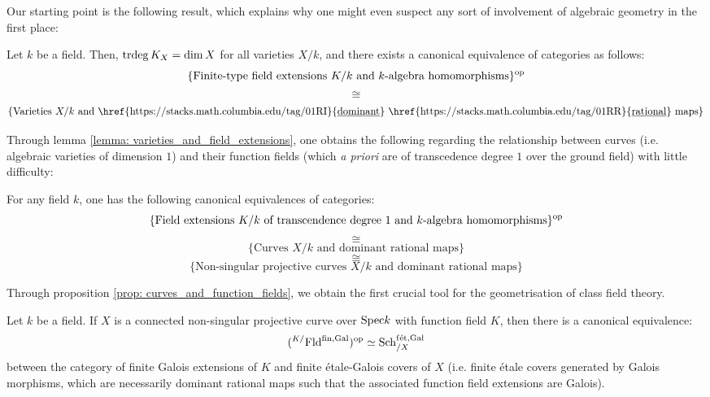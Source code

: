             Our starting point is the following result, which explains why one might even suspect any sort of involvement of algebraic geometry in the first place:
            \begin{lemma} \label{lemma: varieties_and_field_extensions}
                \cite[\href{https://stacks.math.columbia.edu/tag/0BXN}{Tag 0BXN}]{stacks} Let $k$ be a field. Then, $\operatorname{trdeg} K_X = \dim X$ for all varieties $X/k$, and there exists a canonical equivalence of categories as follows:
                    $$\{\text{Finite-type field extensions $K/k$ and $k$-algebra homomorphisms}\}^{\mathrm{op}}$$
                    $$\cong$$
                    $$\{\text{Varieties $X/k$ and \href{https://stacks.math.columbia.edu/tag/01RI}{\underline{dominant}} \href{https://stacks.math.columbia.edu/tag/01RR}{\underline{rational}} maps}\}$$
            \end{lemma}
            Through lemma \ref{lemma: varieties_and_field_extensions}, one obtains the following regarding the relationship between curves (i.e. algebraic varieties of dimension $1$) and their function fields (which \textit{a priori} are of transcedence degree $1$ over the ground field) with little difficulty:
            \begin{proposition} \label{prop: curves_and_function_fields}
                \cite[\href{https://stacks.math.columbia.edu/tag/0BY1}{Tag 0BY1}]{stacks} For any field $k$, one has the following canonical equivalences of categories:
                    $$\{\text{Field extensions $K/k$ of transcendence degree $1$ and $k$-algebra homomorphisms}\}^{\mathrm{op}}$$
                    $$\cong$$
                    $$\{\text{Curves $X/k$ and dominant rational maps}\}$$
                    $$\cong$$
                    $$\{\text{Non-singular projective curves $X/k$ and dominant rational maps}\}$$
            \end{proposition}
            Through proposition \ref{prop: curves_and_function_fields}, we obtain the first crucial tool for the geometrisation of class field theory.
            \begin{corollary} \label{coro: galois_covers_of_curves_and_galois_extensions}
                Let $k$ be a field. If $X$ is a connected non-singular projective curve over $\mathrm{Spec} k$ with function field $K$, then there is a canonical equivalence:
                    $$({}^{K/}\mathrm{Fld}^{\mathrm{fin}, \mathrm{Gal}})^{\mathrm{op}} \simeq \mathrm{Sch}_{/X}^{\mathrm{f\acute{e}t}, \mathrm{Gal}}$$
                between the category of finite Galois extensions of $K$ and finite \'etale-Galois covers of $X$ (i.e. finite \'etale covers generated by Galois morphisms, which are necessarily dominant rational maps such that the associated function field extensions are Galois). 
            \end{corollary}
